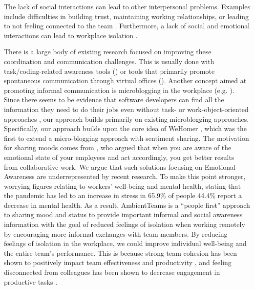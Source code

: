 The lack of social interactions can lead to other interpersonal problems. Examples include difficulties in building trust, maintaining working relationships, or leading to not feeling connected to the team \autocite{comella2020revisiting, olson2006bridging}. Furthermore, a lack of social and emotional interactions can lead to workplace isolation \autocite{marshall2007workplace, gorlick2020productivity, mulki2009set}.

There is a large body of existing research focused on improving these coordination and communication challenges. This is usually done with task/coding-related awareness tools (\autocite{biehl2007fastdash, jakobsen2009wipdash}) or tools that primarily promote spontaneous communication through virtual offices (\autocite{sasaki1999video, lou2012presencescape}). Another concept aimed at promoting informal communication is microblogging in the workplace (e.g. \autocite{ebner2008microblogging, ehrlich2010microblogging, zhang2010case,dullemond2013fixing}). Since there seems to be evidence that software developers can find all the information they need to do their jobs even without task- or work-object-oriented approaches \autocite{gutwin2004group}, our approach builds primarily on existing microblogging approaches. Specifically, our approach builds upon the core idea of WeHomer \autocite{dullemond2013fixing}, which was the first to extend a micro-blogging approach with sentiment sharing. The motivation for sharing moods comes from \textcite{garcia1999emotional}, who argued that when you are aware of the emotional state of your employees and act accordingly, you get better results from collaborative work. We argue that such solutions focusing on Emotional Awareness are underrepresented by recent research. To make this point stronger, worrying figures relating to workers' well-being and mental health, stating that the pandemic has led to an increase in stress in 65.9\% of people 44.4\% report a decrease in mental health. As a result, AmbientTeams is a \enquote{people first} approach to sharing mood and status to provide important informal and social awareness information with the goal of reduced feelings of isolation when working remotely by encouraging more informal exchanges with team members. By reducing feelings of isolation in the workplace, we could improve individual well-being and the entire team's performance. This is because strong team cohesion has been shown to positively impact team effectiveness and productivity \autocite{carlson2017virtual}, and feeling disconnected from colleagues has been shown to decrease engagement in productive tasks \autocite{lostFocus2020}.

